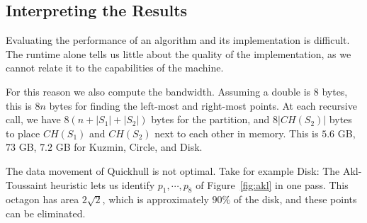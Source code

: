 %
%
%
%
%
%
%

\subsection{Interpreting the Results}

Evaluating the performance of an algorithm and its implementation is difficult.
The runtime alone tells us little about the quality of the implementation, as
we cannot relate it to the capabilities of the machine.

For this reason we also compute the bandwidth. Assuming a double is $8$ bytes,
this is $8n$ bytes for finding the left-most and right-most points. At each
recursive call, we have $8(n + |S_1| + |S_2|)$ bytes for the partition,
and $8|CH(S_2)|$ bytes to place $CH(S_1)$ and $CH(S_2)$ next to each other in
memory. This is $5.6$ GB, $73$ GB, $7.2$ GB for Kuzmin, Circle, and Disk.

The data movement of Quickhull is not optimal. Take for example Disk:
The Akl-Toussaint heuristic \cite{Akl78} lets us identify $p_1, \cdots, p_8$
of Figure~\ref{fig:akl} in one pass. This octagon has area $2\sqrt{2}$,
which is approximately $90\%$ of the disk, and these points can be eliminated.

